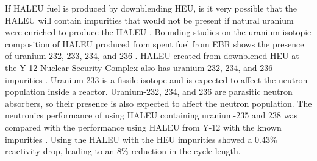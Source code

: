 If \gls{HALEU} fuel is produced by downblending \gls{HEU}, is it very possible that 
the \gls{HALEU} will contain impurities that would not be present if natural uranium 
were enriched to produce the \gls{HALEU} \cite{noauthor_establishing_2022}. Bounding 
studies on the uranium isotopic 
composition of \gls{HALEU} produced from spent fuel from \gls{EBR} shows the presence 
of uranium-232, 233, 234, and 236 \cite{vaden_isotopic_2018}. \gls{HALEU} created from 
downblened \gls{HEU} at the Y-12 Nuclear Security Complex also has uranium-232, 234, and 
236 impurities \cite{nelson_foreign_2010}. Uranium-233 is a fissile 
isotope and is expected to affect the neutron population inside a reactor. Uranium-232, 
234, and 236 are parasitic neutron absorbers, so their presence is also expected to affect 
the neutron population. The neutronics performance of using \gls{HALEU} containing
uranium-235 and 238 was compared with the performance using \gls{HALEU} from Y-12 with the 
known impurities \cite{celikten_effects_2021}. Using 
the \gls{HALEU} with the \gls{HEU} impurities showed a 0.43\% reactivity drop, leading to 
an 8\% reduction in the cycle length. 
